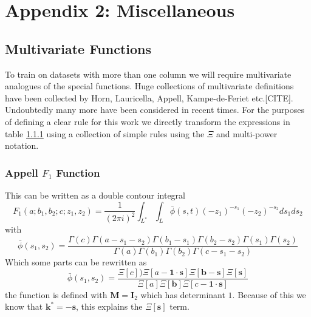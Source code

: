 \documentclass[journal=jcisd8,manuscript=article,layout=onecolumn,pdftex,floatfix,amsmath,amssymb,10pt]{achemso}
\begin{document}
\section{Appendix 2: Miscellaneous}
\subsection{Multivariate Functions}
To train on datasets with more than one column we will require multivariate analogues of the special functions. Huge collections of multivariate definitions have been collected by Horn, Lauricella, Appell, Kampe-de-Feriet etc.[CITE]. Undoubtedly many more have been considered in recent times. For the purposes of defining a clear rule for this work we directly transform the expressions in table \ref{} using a collection of simple rules using the $\Xi$ and multi-power notation.

\subsubsection{Appell $F_1$ Function}
This can be written as a double contour integral
\begin{equation}
F_1(a;b_1,b_2;c;z_1,z_2) = \frac{1}{(2\pi i)^2}\int_{L^*} \int_L  \bar{\phi}(s,t) (-z_1)^{-s_1}(-z_2)^{-s_2} ds_1 ds_2
\end{equation}
with \begin{equation}
\bar{\phi}(s_1,s_2) = \frac{\Gamma(c)\Gamma(a-s_1-s_2)\Gamma(b_1-s_1)\Gamma(b_2-s_2)\Gamma(s_1)\Gamma(s_2)}{\Gamma(a)\Gamma(b_1)\Gamma(b_2)\Gamma(c-s_1-s_2)}
\end{equation}
Which some parts can be rewritten as 
\begin{equation}
\bar{\phi}(s_1,s_2) = \frac{\Xi[c])\Xi[a-\mathbf{1}\cdot\mathbf{s}]\Xi[\mathbf{b}-\mathbf{s}]\Xi[\mathbf{s}]}{\Xi[a]\Xi[\mathbf{b}]\Xi[c-\mathbf{1}\cdot\mathbf{s}]}
\end{equation}
the function is defined with $\mathbf{M}=\mathbf{I}_2$ which has determinant $1$. Because of this we know that $\mathbf{k}^* = -\mathbf{s}$, this explains the $\Xi[\mathbf{s}]$ term.
\end{document}

